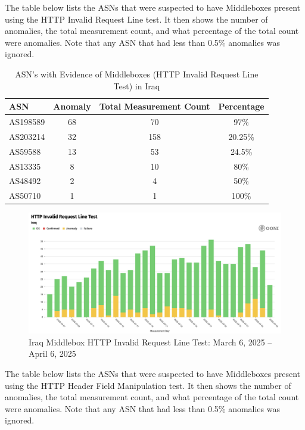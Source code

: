 The table below lists the ASNs that were suspected to have Middleboxes present using the HTTP Invalid Request Line test. It then shows the number of anomalies, the total measurement count, and what percentage of the total count were anomalies. Note that any ASN that had less than 0.5\% anomalies was ignored.

\begin{table}[H]
\centering
\caption{ASN's with Evidence of Middleboxes (HTTP Invalid Request Line Test) in Iraq}
\begin{tabular}{lccc}
\toprule
\textbf{ASN} & \textbf{Anomaly} & \textbf{Total Measurement Count} & \textbf{Percentage} \\
\midrule
AS198589  & 68 & 70 & 97\% \\
AS203214  & 32 & 158 & 20.25\% \\
AS59588   & 13 & 53 & 24.5\% \\
AS13335   & 8 & 10 & 80\% \\
AS48492   & 2 & 4 & 50\% \\
AS50710   & 1 & 1 & 100\% \\
\bottomrule
\end{tabular}
\label{tab:category_block}
\end{table}

\begin{figure}[H]
    \centering
    \includegraphics[width=\textwidth]{Griff/TCD SCSS CAPSTONE/Results/IraqMiddleboxHTTPInvalidTest.png}
    \caption{Iraq Middlebox HTTP Invalid Request Line Test: March 6, 2025 -- April 6, 2025}
    \label{fig:iraq-middlebox-invalid-request}
\end{figure}

The table below lists the ASNs that were suspected to have Middleboxes present using the HTTP Header Field Manipulation test. It then shows the number of anomalies, the total measurement count, and what percentage of the total count were anomalies. Note that any ASN that had less than 0.5\% anomalies was ignored.

